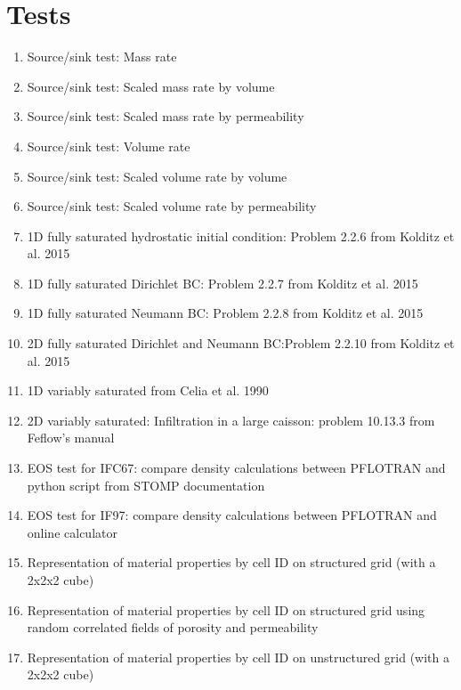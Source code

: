 \section{Tests}
\begin{enumerate}[label=Test \alph*.,ref=Test \alph*,nosep]
	\item \label{testMassRate} Source/sink test: Mass rate
	\item \label{testScaledMassRateVol} Source/sink test: Scaled mass rate by volume
	\item \label{testScaledMassRatePerm} Source/sink test: Scaled mass rate by permeability
	\item \label{testVolRate} Source/sink test: Volume rate
	\item \label{testScaledVolRateVol} Source/sink test: Scaled volume rate by volume
	\item \label{testScaledVolRatePerm} Source/sink test: Scaled volume rate by permeability
	\item \label{test1DSatHyd} 1D fully saturated hydrostatic initial condition: Problem 2.2.6 from Kolditz et al. 2015
	\item \label{test1DSatDirBC} 1D fully saturated Dirichlet BC: Problem 2.2.7 from Kolditz et al. 2015
	\item \label{test1DSatNeumBC} 1D fully saturated Neumann BC: Problem 2.2.8 from Kolditz et al. 2015
	\item \label{test2DSatDirNeumBC} 2D fully saturated Dirichlet and Neumann BC:Problem 2.2.10 from Kolditz et al. 2015
	\item \label{test1DVarSatCelia} 1D variably saturated from Celia et al. 1990
	\item \label{test2DVarSat} 2D variably saturated: Infiltration in a large caisson: problem 10.13.3 from Feflow's manual
	\item \label{testEOSIFC67} EOS test for IFC67: compare density calculations between PFLOTRAN and python script from STOMP documentation
	\item \label{testEOSIF97} EOS test for IF97: compare density calculations between PFLOTRAN and online calculator
	\item \label{testRepMatCellIDStruc} Representation of material properties by cell ID on structured grid (with a 2x2x2 cube)
	\item \label{testRepMatCellIDStruc16} Representation of material properties by cell ID on structured grid using random correlated fields of porosity and permeability
	\item \label{testRepMatCellIDUnstruc} Representation of material properties by cell ID on unstructured grid (with a 2x2x2 cube)

\end{enumerate}
